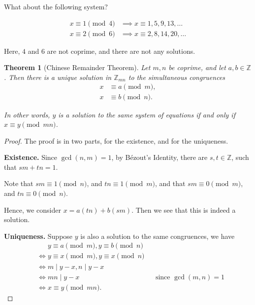 \documentclass{article}
\newtheorem{theorem}{Theorem}[section]
\theoremstyle{definition}
\theoremstyle{remark}
\newcommand{\pqty}[1]{\left(#1\right)}
\newcommand{\divides}{\mid}
\newcommand{\ZZ}{\mathbb{Z}}
\begin{document}
What about the following system?

\begin{align*}
    x \equiv 1 \pmod{4} &\implies x \equiv 1, 5, 9, 13, \ldots \\
    x \equiv 2 \pmod{6} &\implies x \equiv 2, 8, 14, 20, \ldots
\end{align*}

Here, \(4\) and \(6\) are not coprime, and there are not any solutions.

\begin{theorem}[Chinese Remainder Theorem]
    Let \(m, n\) be coprime, and let \(a, b \in \ZZ\). Then there is a unique solution in \(\ZZ_{mn}\) to the simultaneous congruences
    \begin{align*}
        x &\equiv a \pmod{m}, \\
        x &\equiv b \pmod{n}.
    \end{align*}

    In other words, \(y\) is a solution to the same system of equations if and only if \(x \equiv y \pmod{mn}\).
\end{theorem}

\begin{proof}
    The proof is in two parts, for the existence, and for the uniqueness.

    \textbf{Existence.} Since \(\gcd\pqty{n, m} = 1\), by B\'{e}zout's Identity, there are \(s, t \in \ZZ\), such that \(sm + tn = 1\).

    Note that \(sm \equiv 1 \pmod{n}\), and \(tn \equiv 1 \pmod{m}\), and that \(sm \equiv 0 \pmod{m}\), and \(tn \equiv 0 \pmod{n}\).

    Hence, we consider \(x = a \pqty{tn} + b \pqty{sm}\). Then we see that this is indeed a solution.

    \textbf{Uniqueness.} Suppose \(y\) is also a solution to the same congruences, we have
    \begin{align*}
        &\phantom{\iff} y \equiv a \pmod{m}, y \equiv b \pmod{n} \\
        &\iff y \equiv x \pmod{m}, y \equiv x \pmod{n} \\
        &\iff m \divides y - x, n \divides y - x \\
        &\iff mn \divides y - x && \text{since } \gcd\pqty{m, n} = 1 \\
        &\iff x \equiv y \pmod{mn}.
    \end{align*}
\end{proof}
\end{document}
